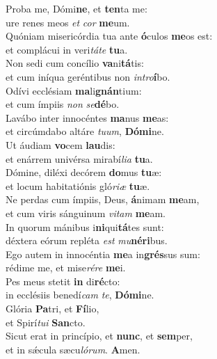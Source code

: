 \evenverse Proba me, Dómi\textbf{ne}, et \textbf{ten}ta me:~\*\\
\evenverse ure renes meos \textit{et} \textit{cor} \textbf{me}um.\\
\oddverse Quóniam misericórdia tua ante \textbf{ó}culos \textbf{me}os est:~\*\\
\oddverse et complácui in veri\textit{tá}\textit{te} \textbf{tu}a.\\
\evenverse Non sedi cum concílio \textbf{va}ni\textbf{tá}tis:~\*\\
\evenverse et cum iníqua geréntibus non \textit{in}\textit{tro}\textbf{í}bo.\\
\oddverse Odívi ecclésiam \textbf{ma}li\textbf{gnán}tium:~\*\\
\oddverse et cum ímpiis \textit{non} \textit{se}\textbf{dé}bo.\\
\evenverse Lavábo inter innocéntes \textbf{ma}nus \textbf{me}as:~\*\\
\evenverse et circúmdabo altáre \textit{tu}\textit{um}, \textbf{Dó}\textbf{mi}ne.\\
\oddverse Ut áudiam \textbf{vo}cem \textbf{lau}dis:~\*\\
\oddverse et enárrem univérsa mirabí\textit{li}\textit{a} \textbf{tu}a.\\
\evenverse Dómine, diléxi decórem \textbf{do}mus \textbf{tu}æ:~\*\\
\evenverse et locum habitatiónis gló\textit{ri}\textit{æ} \textbf{tu}æ.\\
\oddverse Ne perdas cum ímpiis, Deus, \textbf{á}nimam \textbf{me}am,~\*\\
\oddverse et cum viris sánguinum \textit{vi}\textit{tam} \textbf{me}am.\\
\evenverse In quorum mánibus i\textbf{ni}qui\textbf{tá}tes sunt:~\*\\
\evenverse déxtera eórum repléta \textit{est} \textit{mu}\textbf{né}\textbf{ri}bus.\\
\oddverse Ego autem in innocéntia \textbf{me}a in\textbf{grés}sus sum:~\*\\
\oddverse rédime me, et mise\textit{ré}\textit{re} \textbf{me}i.\\
\evenverse Pes meus stetit \textbf{in} di\textbf{ré}cto:~\*\\
\evenverse in ecclésiis benedí\textit{cam} \textit{te}, \textbf{Dó}\textbf{mi}ne.\\
\oddverse Glória \textbf{Pa}tri, et \textbf{Fí}lio,~\*\\
\oddverse et Spirí\textit{tu}\textit{i} \textbf{San}cto.\\
\evenverse Sicut erat in princípio, et \textbf{nunc}, et \textbf{sem}per,~\*\\
\evenverse et in sǽcula sæcu\textit{ló}\textit{rum}. \textbf{A}men.\\
